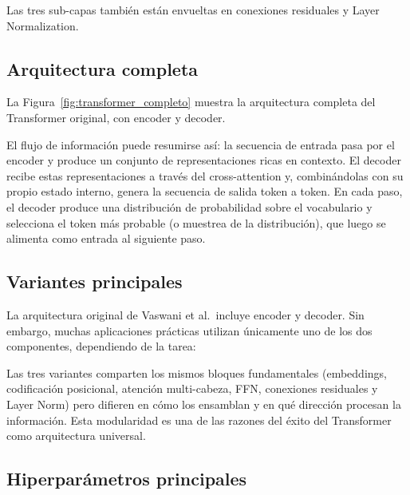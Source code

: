 Las tres sub-capas también están envueltas en conexiones residuales y
Layer Normalization.

\subsection{Arquitectura completa}
\label{subsec:arquitectura_completa}

La Figura~\ref{fig:transformer_completo} muestra la arquitectura completa
del Transformer original, con encoder y decoder.



El flujo de información puede resumirse así: la secuencia de entrada pasa
por el encoder y produce un conjunto de representaciones ricas en contexto.
El decoder recibe estas representaciones a través del cross-attention y,
combinándolas con su propio estado interno, genera la secuencia de salida
token a token. En cada paso, el decoder produce una distribución de
probabilidad sobre el vocabulario y selecciona el token más probable (o
muestrea de la distribución), que luego se alimenta como entrada al
siguiente paso.

\subsection{Variantes principales}
\label{subsec:variantes}

La arquitectura original de Vaswani et al.\ incluye encoder y decoder.
Sin embargo, muchas aplicaciones prácticas utilizan únicamente uno de
los dos componentes, dependiendo de la tarea:



Las tres variantes comparten los mismos bloques fundamentales (embeddings,
codificación posicional, atención multi-cabeza, FFN, conexiones residuales
y Layer Norm) pero difieren en cómo los ensamblan y en qué dirección
procesan la información. Esta modularidad es una de las razones del éxito
del Transformer como arquitectura universal.

\subsection{Hiperparámetros principales}
\label{subsec:hiperparametros}

